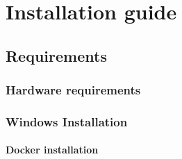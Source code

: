 \chapter{Installation guide}
\section{Requirements}
\subsection{Hardware requirements}

\subsection{Windows Installation}
\subsubsection{Docker installation}
